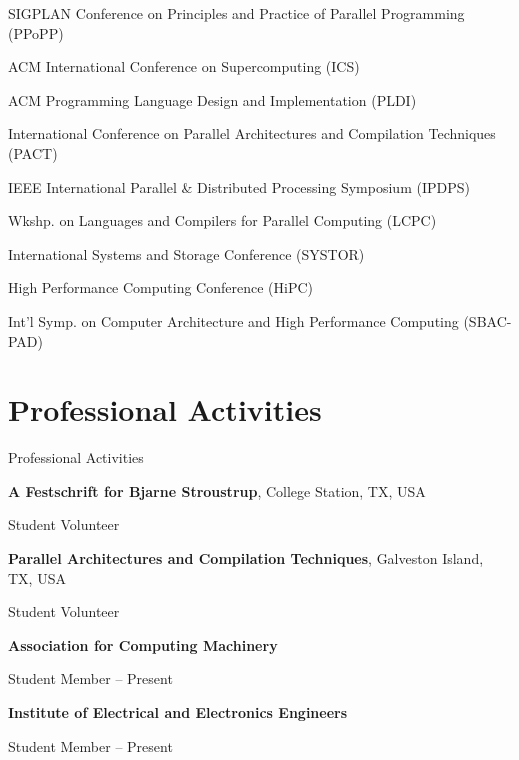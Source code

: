 \documentclass[a4paper,10pt,oneside]{article}
\begin{document}
\begin{body}
SIGPLAN Conference on Principles and Practice of Parallel Programming (PPoPP)
\par ACM International Conference on Supercomputing (ICS)
\par ACM Programming Language Design and Implementation (PLDI)
\par International Conference on Parallel Architectures and Compilation Techniques (PACT)
\par IEEE International Parallel \& Distributed Processing Symposium (IPDPS)
\par Wkshp. on Languages and Compilers for Parallel Computing (LCPC)
\par International Systems and Storage Conference (SYSTOR)
\par High Performance Computing Conference (HiPC)
\par Int'l Symp. on Computer Architecture and High Performance Computing (SBAC-PAD)


\section{Professional Activities}
{Professional Activities}

{\textbf{A Festschrift for Bjarne Stroustrup}, College Station, TX, USA }
\par
Student Volunteer
\hfill
{}

\EntryGap


{\textbf{Parallel Architectures and Compilation Techniques}, Galveston Island, TX, USA }
\par
Student Volunteer
\hfill
{}


\EntryGap

{\textbf{Association for Computing Machinery}}
\par
Student Member
\hfill
{} --
Present

\EntryGap
{\textbf{Institute of Electrical and Electronics Engineers }}
\par
Student Member
\hfill
{} --
Present





\end{body}
\end{document}
